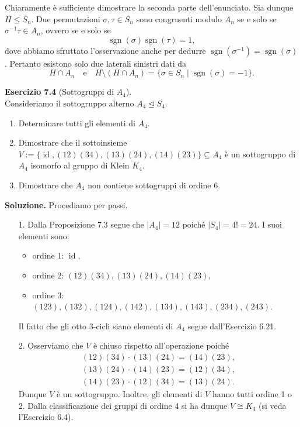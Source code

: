 \documentclass[12px]{article}
\begin{document}
{\begin{dimo}
Chiaramente è sufficiente dimostrare la seconda parte dell'enunciato. Sia dunque $H \leq S_n$.
Due permutazioni $\sigma, \tau \in S_n$ sono congruenti modulo $A_n$ se e solo se $\sigma^{-1}\tau \in A_n$,
ovvero se e solo se
\[
\operatorname{sgn}(\sigma)\operatorname{sgn}(\tau) = 1,
\]
dove abbiamo sfruttato l'osservazione anche per dedurre $\operatorname{sgn}(\sigma^{-1}) = \operatorname{sgn}(\sigma)$.
Pertanto esistono solo due laterali sinistri dati da
\[
H \cap A_n \quad \text{e} \quad H \setminus (H \cap A_n) = \{\sigma \in S_n \mid \operatorname{sgn}(\sigma) = -1\}.
\]
\end{dimo}
\textbf{Esercizio 7.4} (Sottogruppi di $A_4$).\\ Consideriamo il sottogruppo alterno $A_4 \trianglelefteq S_4$.
\begin{enumerate}
    \item Determinare tutti gli elementi di $A_4$.
    \item Dimostrare che il sottoinsieme $V := \{\operatorname{id}, (12)(34), (13)(24), (14)(23)\} \subseteq A_4$ è un sottogruppo di $A_4$ isomorfo al gruppo di Klein $K_4$.
    \item Dimostrare che $A_4$ non contiene sottogruppi di ordine 6.
\end{enumerate}
\textbf{Soluzione.} Procediamo per passi.
\begin{enumerate}
    \item[1.] Dalla Proposizione 7.3 segue che $\lvert A_4 \rvert = 12$ poiché $\lvert S_4 \rvert = 4! = 24$. I suoi elementi sono:
    \begin{itemize}
        \item ordine 1: $\operatorname{id}$,
        \item ordine 2: $(12)(34), (13)(24), (14)(23)$,
        \item ordine 3: $(123), (132), (124), (142), (134), (143), (234), (243)$.
    \end{itemize}
    Il fatto che gli otto 3-cicli siano elementi di $A_4$ segue dall'Esercizio 6.21.

    \item[2.] Osserviamo che $V$ è chiuso rispetto all'operazione poiché
	    \begin{gather*}
    (12)(34) \cdot (13)(24) = (14)(23), \\
    (13)(24) \cdot (14)(23) = (12)(34),\\
    (14)(23) \cdot (12)(34) = (13)(24).
    \end{gather*}
    Dunque $V$ è un sottogruppo. Inoltre, gli elementi di $V$ hanno tutti ordine 1 o 2. Dalla classificazione dei gruppi di ordine 4 si ha dunque $V \cong K_4$ (si veda l'Esercizio 6.4).


\end{enumerate}}
\end{document}
